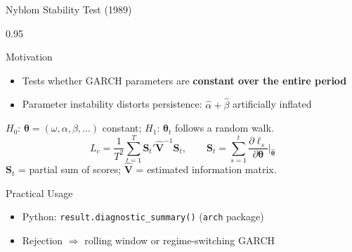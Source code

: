 \documentclass[9pt, aspectratio=169, t]{beamer}
\begin{document}
\begin{frame}{Nyblom Stability Test (1989)}
    \begin{cminipage}{0.95\textwidth}
    {\footnotesize
    \begin{block}{Motivation}
        \begin{itemize}\setlength{\itemsep}{0pt}
            \item Tests whether GARCH parameters are \textbf{constant over the entire period}
            \item Parameter instability distorts persistence: $\hat{\alpha} + \hat{\beta}$ artificially inflated
        \end{itemize}
    \end{block}
    \vspace{-1mm}
    \begin{defn}
        $H_0$: $\boldsymbol{\theta} = (\omega, \alpha, \beta, \ldots)$ constant; $H_1$: $\boldsymbol{\theta}_t$ follows a random walk.
        \vspace{-2mm}
        \[
            L_c = \frac{1}{T^2} \sum_{t=1}^T \mathbf{S}_t' \hat{\mathbf{V}}^{-1} \mathbf{S}_t, \qquad \mathbf{S}_t = \sum_{s=1}^t \frac{\partial \ell_s}{\partial \boldsymbol{\theta}}\bigg|_{\hat{\boldsymbol{\theta}}}
        \]
        \vspace{-2mm}
        $\mathbf{S}_t$ = partial sum of scores; $\hat{\mathbf{V}}$ = estimated information matrix.
    \end{defn}
    \vspace{-1mm}
    \begin{alertblock}{Practical Usage}
        \begin{itemize}\setlength{\itemsep}{0pt}
            \item Python: \texttt{result.diagnostic\_summary()} (\texttt{arch} package)
            \item Rejection $\Rightarrow$ rolling window or regime-switching GARCH
        \end{itemize}
    \end{alertblock}
    }
    \end{cminipage}
\end{frame}
\end{document}
